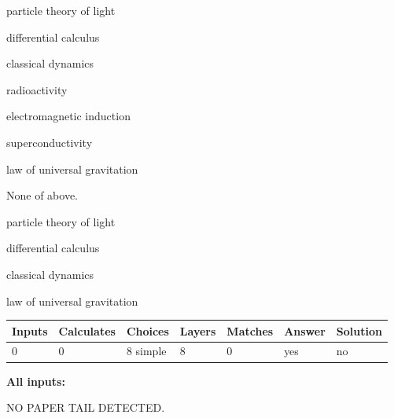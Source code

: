 \documentclass[12pt]{article}
\begin{document}
 
particle theory of light
 
 
differential calculus
 
 
classical dynamics
 
 
radioactivity
 
 
electromagnetic induction
 
 
superconductivity
 
 
law of universal gravitation
 
 
 None of above.
 
 
\noindent{}
 
 
particle theory of light
 
 
differential calculus
 
 
classical dynamics
 
 
law of universal gravitation
 
 
\noindent{}
 
 
   
   
   
   
\noindent\begin{tabular}{|l|l|l|l|l|l|l|}
 \hline
Inputs & Calculates & Choices & Layers & Matches & Answer & Solution \\ \hline
 0  & 
 0  & 
 8
  simple  
  & 
 8  & 
 0  & 
  yes & 
  no 
  \\ \hline
 \end{tabular}
   
   
   
   
\noindent{}
   
   
   
   
\noindent\vspace{0.1in}\hspace{-0.08in} {\textbf{\Large{All inputs: }}}
   
   
   
   
\vspace{2.0in} NO PAPER TAIL DETECTED.
   
\end{document}
